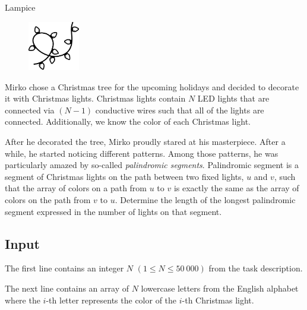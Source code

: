 \begin{statement}[
  problempoints=110,
  timelimit=1 second,
  memorylimit=512 MiB,
]{Lampice}

\setlength\intextsep{-0.1cm}
\begin{figure}
\centering
\includegraphics[width=0.2\textwidth]{img/lampice.png}
\end{figure}

Mirko chose a Christmas tree for the upcoming holidays and decided to decorate
it with Christmas lights. Christmas lights contain $N$ LED lights that are
connected via $(N-1)$ conductive wires such that all of the lights are connected.
Additionally, we know the color of each Christmas light.

After he decorated the tree, Mirko proudly stared at his masterpiece. After a
while, he started noticing different patterns. Among those patterns, he was
particularly amazed by so-called \textit{palindromic segments}. Palindromic
segment is a segment of Christmas lights on the path between two fixed lights,
$u$ and $v$, such that the array of colors on a path from $u$ to $v$ is exactly
the same as the array of colors on the path from $v$ to $u$.
Determine the length of the longest palindromic segment
expressed in the number of lights on that segment.


\subsection*{Input}
The first line contains an integer $N$ $(1 \le N \le 50\ 000)$ from the task
description.

The next line contains an array of $N$ lowercase letters from the English
alphabet where the $i$-th letter represents the color of the $i$-th Christmas
light.


\end{statement}
